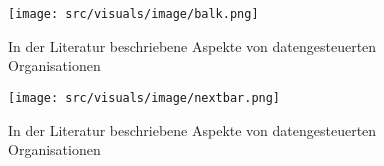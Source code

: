     

\begin{figure}[htb]
    \centering
    \texttt{[image: src/visuals/image/balk.png]}
    \caption{In der Literatur beschriebene Aspekte von datengesteuerten Organisationen}
    \label{fig:balks}
\end{figure}


\begin{figure}[htb]
    \centering
    \texttt{[image: src/visuals/image/nextbar.png]}
    \caption{In der Literatur beschriebene Aspekte von datengesteuerten Organisationen}
    \label{fig:nextbar}
\end{figure}

